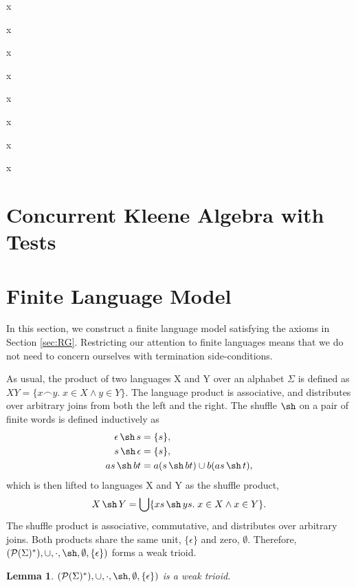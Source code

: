 \documentclass{llncs}
\DeclareMathOperator{\sha}{\sh}
\newtheorem{lem}{Lemma}
\begin{document}
x

x

x

x

x

x

x

x
\newpage
\section{Concurrent Kleene Algebra with Tests}

\newpage
\section{Finite Language Model}

In this section, we construct a finite language model satisfying the
axioms in Section \ref{sec:RG}. Restricting our attention to finite
languages means that we do not need to concern ourselves with
termination side-conditions.

As usual, the product of two languages X and Y over an alphabet
$\Sigma$ is defined as $XY = \{x\frown y.\; x \in X \land y \in Y\}$.
The language product is associative, and distributes over arbitrary
joins from both the left and the right. The shuffle $\sha$ on a pair
of finite words is defined inductively as
\begin{align*}
\epsilon \sha s &= \{s\},\\
s \sha \epsilon &= \{s\},\\
as \sha bt &= a(s \sha bt) \cup b(as \sha t),
\end{align*}
which is then lifted to languages X and Y as the shuffle product,
\begin{align*}
X \sha Y = \bigcup\{xs \sha ys.\; x \in X \land x \in Y\}.
\end{align*}
The shuffle product is associative, commutative, and distributes over
arbitrary joins. Both products share the same unit, $\{\epsilon\}$ and
zero, $\emptyset$. Therefore, $(\mathcal{P}(\Sigma)^*), \cup, \cdot,
\sha, \emptyset, \{\epsilon\})$ forms a weak trioid.

\begin{lem}
$(\mathcal{P}(\Sigma)^*), \cup, \cdot, \sha, \emptyset, \{\epsilon\})$ is a weak trioid.
\end{lem}
\end{document}
